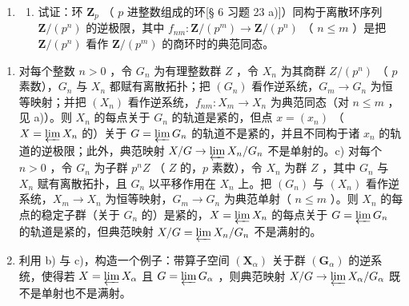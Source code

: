 \BourbakiExerciseGroup

\begin{enumerate}
\def\labelenumi{\arabic{enumi})}
\tightlist
\item
  \begin{enumerate}
  \def\labelenumii{\alph{enumii})}
  \tightlist
  \item
    试证：环 \(\mathbf{Z}_p\) （ \(p\) 进整数组成的环{[}§ 6 习题 23 a){]}）同构于离散环序列 \(\mathbf{Z}/(p^n)\) 的逆极限，其中 \(f_{nm}: \mathbf{Z}/(p^m) \to \mathbf{Z}/(p^n)\) （ \(n \leqslant m\) ）是把 \(\mathbf{Z}/(p^n)\) 看作 \(\mathbf{Z}/(p^m)\) 的商环时的典范同态。
  \end{enumerate}
\end{enumerate}

\begin{enumerate}
\def\labelenumi{\alph{enumi})}
\setcounter{enumi}{1}
\item
  对每个整数 \(n > 0\) ，令 \(G_n\) 为有理整数群 \(Z\) ，令 \(X_n\) 为其商群 \(Z/(p^n)\) （ \(p\) 素数），\(G_n\) 与 \(X_n\) 都赋有离散拓扑；把 \((G_n)\) 看作逆系统，\(G_m \to G_n\) 为恒等映射；并把 \((X_n)\) 看作逆系统，\(f_{nm}: X_m \to X_n\) 为典范同态（对 \(n \leqslant m\) ，见 a)）。则 \(X_n\) 的每点关于 \(G_n\) 的轨道是紧的，但点 \(x = (x_n)\) （ \(X = \varprojlim X_n\) 的）关于 \(G = \varprojlim G_n\) 的轨道不是紧的，并且不同构于诸 \(x_n\) 的轨道的逆极限；此外，典范映射 \(X/G \to \varprojlim X_n/G_n\) 不是单射的。c) 对每个 \(n > 0\) ，令 \(G_n\) 为子群 \(p^n Z\) （ \(Z\) 的，\(p\) 素数），令 \(X_n\) 为群 \(Z\) ，其中 \(G_n\) 与 \(X_n\) 赋有离散拓扑，且 \(G_n\) 以平移作用在 \(X_n\) 上。把 \((G_n)\) 与 \((X_n)\) 看作逆系统，\(X_m \to X_n\) 为恒等映射，\(G_m \to G_n\) 为典范单射（ \(n \leqslant m\) ）。则 \(X_n\) 的每点的稳定子群（关于 \(G_n\) 的）是紧的，\(X = \varprojlim X_n\) 的每点关于 \(G = \varprojlim G_n\) 的轨道是紧的，但典范映射 \(X/G = \varprojlim X_n/G_n\) 不是满射的。
\item
  利用 b) 与 c)，构造一个例子：带算子空间 \((\mathbf{X}_{\alpha})\) 关于群 \((\mathbf{G}_{\alpha})\) 的逆系统，使得若 \(X = \varprojlim X_{\alpha}\) 且 \(G = \varprojlim G_{\alpha}\) ，则典范映射 \(X/G \to \varprojlim X_{\alpha}/G_{\alpha}\) 既不是单射也不是满射。
\end{enumerate}


